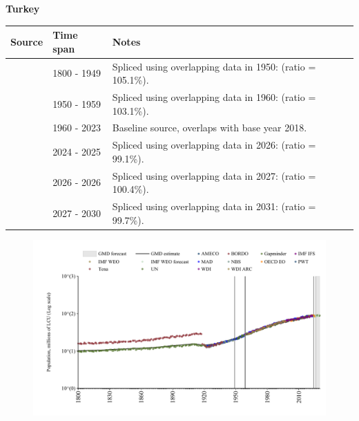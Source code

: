\documentclass[12pt,a4paper,landscape]{article}
\begin{document}
\begin{adjustbox}{max totalsize={\paperwidth}{\paperheight},center}
\begin{minipage}[t][\textheight][t]{\textwidth}
\vspace*{0.5cm}
{}
\begin{center}
{\Large\bfseries Turkey}
\end{center}
\vspace{0.5cm}
\begin{table}[H]
\centering
\small
\begin{tabular}{|l|l|l|}
\hline
\textbf{Source} & \textbf{Time span} & \textbf{Notes} \\
\hline
\rowcolor{white}\cite{Gapminder}& 1800 - 1949 &Spliced using overlapping data in 1950: (ratio = 105.1\%).\\
\rowcolor{lightgray}\cite{IMF_IFS}& 1950 - 1959 &Spliced using overlapping data in 1960: (ratio = 103.1\%).\\
\rowcolor{white}\cite{WDI}& 1960 - 2023 &Baseline source, overlaps with base year 2018.\\
\rowcolor{lightgray}\cite{OECD_EO}& 2024 - 2025 &Spliced using overlapping data in 2026: (ratio = 99.1\%).\\
\rowcolor{white}\cite{AMECO}& 2026 - 2026 &Spliced using overlapping data in 2027: (ratio = 100.4\%).\\
\rowcolor{lightgray}\cite{Gapminder}& 2027 - 2030 &Spliced using overlapping data in 2031: (ratio = 99.7\%).\\
\hline
\end{tabular}
\end{table}
\begin{figure}[H]
\centering
\includegraphics[width=\textwidth,height=0.6\textheight,keepaspectratio]{graphs/TUR_pop.pdf}
\end{figure}
\end{minipage}
\end{adjustbox}
\end{document}
